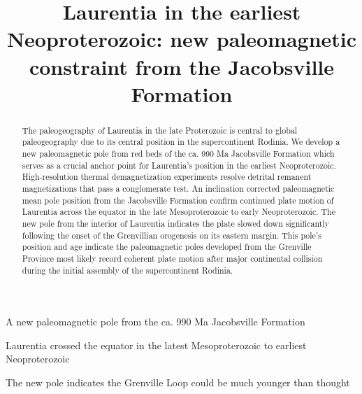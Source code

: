 \documentclass[draft]{agujournal2019}
\begin{document}
\title{Laurentia in the earliest Neoproterozoic: new paleomagnetic constraint from the Jacobsville Formation}




\begin{keypoints}
\item A new paleomagnetic pole from the ca. 990 Ma Jacobsville Formation \item Laurentia crossed the equator in the latest Mesoproterozoic to earliest Neoproterozoic
\item The new pole indicates the Grenville Loop could be much younger than thought
\end{keypoints}


\begin{abstract}
The paleogeography of Laurentia in the late Proterozoic is central to global paleogeography due to its central position in the supercontinent Rodinia. We develop a new paleomagnetic pole from red beds of the ca. 990 Ma Jacobsville Formation which serves as a crucial anchor point for Laurentia's position in the earliest Neoproterozoic. High-resolution thermal demagnetization experiments resolve detrital remanent magnetizations that pass a conglomerate test. An inclination corrected paleomagnetic mean pole position from the Jacobsville Formation confirm continued plate motion of Laurentia across the equator in the late Mesoproterozoic to early Neoproterozoic. The new pole from the interior of Laurentia indicates the plate slowed down significantly following the onset of the Grenvillian orogenesis on its eastern margin. This pole's position and age indicate the paleomagnetic poles developed from the Grenville Province most likely record coherent plate motion after major continental collision during the initial assembly of the supercontinent Rodinia.
\end{abstract}

\end{document}

